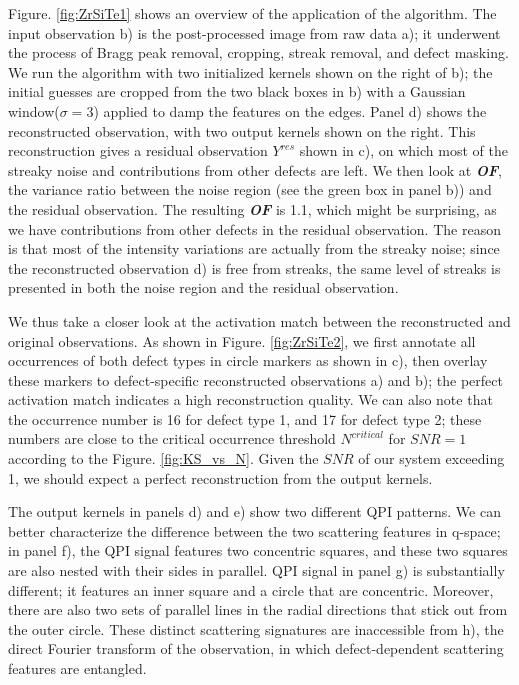 Figure. \ref{fig:ZrSiTe1} shows an overview of the application of the algorithm. The input observation b) is the post-processed image from raw data a); it underwent the process of Bragg peak removal, cropping, streak removal, and defect masking. We run the algorithm with two initialized kernels shown on the right of b); the initial guesses are cropped from the two black boxes in b) with a Gaussian window($\sigma = 3$) applied to damp the features on the edges. Panel d) shows the reconstructed observation, with two output kernels shown on the right. This reconstruction gives a residual observation $Y^{res}$ shown in c), on which most of the streaky noise and contributions from other defects are left. We then look at \textbf{\textit{OF}}, the variance ratio between the noise region (see the green box in panel b)) and the residual observation. The resulting \textbf{\textit{OF}} is 1.1, which might be surprising, as we have contributions from other defects in the residual observation. The reason is that most of the intensity variations are actually from the streaky noise; since the reconstructed observation d) is free from streaks, the same level of streaks is presented in both the noise region and the residual observation. 

We thus take a closer look at the activation match between the reconstructed and original observations. As shown in Figure. \ref{fig:ZrSiTe2}, we first annotate all occurrences of both defect types in circle markers as shown in c), then overlay these markers to defect-specific reconstructed observations a) and b); the perfect activation match indicates a high reconstruction quality. We can also note that the occurrence number is 16 for defect type 1, and 17 for defect type 2; these numbers are close to the critical occurrence threshold $N^{critical}$ for $SNR=1$ according to the Figure. \ref{fig:KS_vs_N}. Given the $SNR$ of our system exceeding 1, we should expect a perfect reconstruction from the output kernels.

The output kernels in panels d) and e) show two different QPI patterns. We can better characterize the difference between the two scattering features in q-space; in panel f), the QPI signal features two concentric squares, and these two squares are also nested with their sides in parallel. QPI signal in panel g) is substantially different; it features an inner square and a circle that are concentric. Moreover, there are also two sets of parallel lines in the radial directions that stick out from the outer circle. These distinct scattering signatures are inaccessible from h), the direct Fourier transform of the observation, in which defect-dependent scattering features are entangled.

